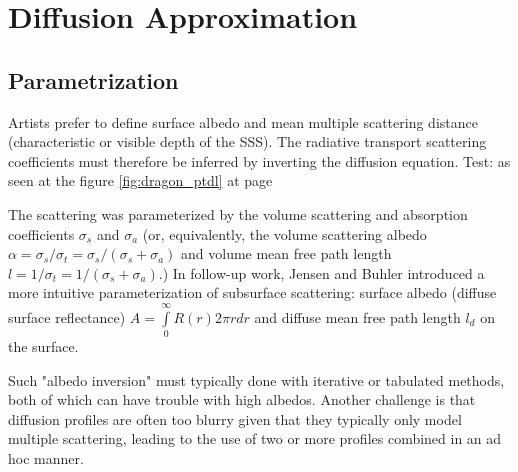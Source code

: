\chapter{Diffusion Approximation}
\label{chapter:da}

\section{Parametrization}
Artists prefer to define surface albedo and mean multiple scattering distance
(characteristic or visible depth of the SSS). The radiative transport scattering
coefficients must therefore be inferred by inverting the diffusion equation.
Test: as seen at the figure \ref{fig:dragon_ptdl} at page \pageref{fig:dragon_ptdl}

The scattering was parameterized by the volume scattering and absorption
coefficients $\sigma_s$ and $\sigma_a$ (or, equivalently, the volume
scattering albedo $\alpha = \sigma_s/\sigma_t = \sigma_s/(\sigma_s + \sigma_a)$
and volume mean free path length $l = 1/\sigma_t = 1/(\sigma_s + \sigma_a)$.)
In follow-up work, Jensen and Buhler \cite{Jensen:2002:RHR:566570.566619}
introduced a more intuitive parameterization of subsurface scattering:
surface albedo (diffuse surface reflectance) $A = \int\limits_0^\infty
R(r)2\pi r dr$ and diffuse mean free path length $l_d$ on the surface.

Such "albedo inversion" must typically done with iterative or tabulated methods,
both of which can have trouble with high albedos. Another challenge is that
diffusion profiles are often too blurry given that they typically only model
multiple scattering, leading to the use of two or more profiles combined in an
ad hoc manner.

